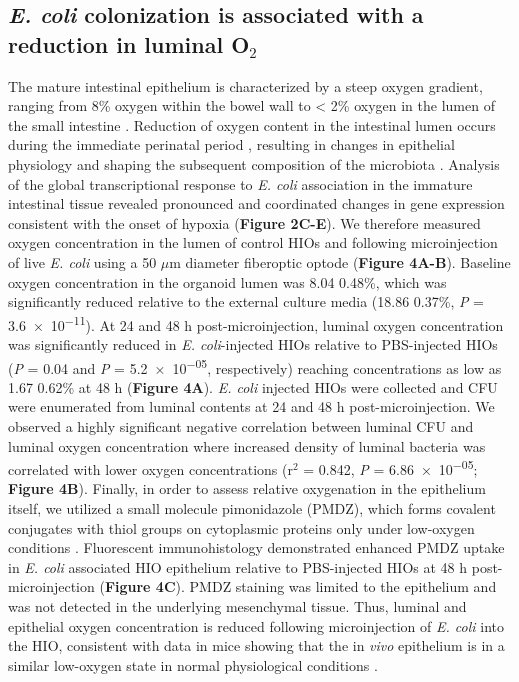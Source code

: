 \documentclass[9pt,lineo]{elife}
\begin{document}
\subsection*{{\bfseries\sffamily } \emph{E. coli} colonization is associated with a reduction in luminal O\(_{\text{2}}\)}
\label{sec:orgheadline6}
The mature intestinal epithelium is characterized by a steep oxygen gradient, ranging from 8\% oxygen within the bowel wall to < 2\% oxygen in the lumen of the small intestine \citep{Fisher:2013}. Reduction of oxygen content in the intestinal lumen occurs during the immediate perinatal period \citep{Gruette:1965}, resulting in changes in epithelial physiology \citep{Glover:2016,Kelly:2015,Colgan:2013,Zeitouni:2016} and shaping the subsequent composition of the microbiota \citep{Schmidt:2014,Espey:2013,Albenberg:2014,Palmer:2007,Koenig:2011}. Analysis of the global transcriptional response to \emph{E. coli} association in the immature intestinal tissue revealed pronounced and coordinated changes in gene expression consistent with the onset of hypoxia (\textbf{Figure 2C-E}). We therefore measured oxygen concentration in the lumen of control HIOs and following microinjection of live \emph{E. coli} using a 50 \(\mu\)m diameter fiberoptic optode (\textbf{Figure 4A-B}). Baseline oxygen concentration in the organoid lumen was 8.04 \textpm{} 0.48\%, which was significantly reduced relative to the external culture media (18.86 \textpm{} 0.37\%, \emph{P} = \num{3.6e-11}). At 24 and 48 h post-microinjection, luminal oxygen concentration was significantly reduced in \emph{E. coli}-injected HIOs relative to PBS-injected HIOs (\emph{P} = \num{0.04} and \emph{P} = \num{5.2e-05}, respectively) reaching concentrations as low as 1.67 \textpm{} 0.62\% at 48 h (\textbf{Figure 4A}). \emph{E. coli} injected HIOs were collected and CFU were enumerated from luminal contents at 24 and 48 h post-microinjection. We observed a highly significant negative correlation between luminal CFU and luminal oxygen concentration where increased density of luminal bacteria was correlated with lower oxygen concentrations (r\(^{\text{2}}\) = 0.842, \emph{P} = \num{6.86e-05}; \textbf{Figure 4B}). Finally, in order to assess relative oxygenation in the epithelium itself, we utilized a small molecule pimonidazole (PMDZ), which forms covalent conjugates with thiol groups on cytoplasmic proteins only under low-oxygen conditions \citep{Arteel:1998}. Fluorescent immunohistology demonstrated enhanced PMDZ uptake in \emph{E. coli} associated HIO epithelium relative to PBS-injected HIOs at 48 h post-microinjection (\textbf{Figure 4C}). PMDZ staining was limited to the epithelium and was not detected in the underlying mesenchymal tissue. Thus, luminal and epithelial oxygen concentration is reduced following microinjection of \emph{E. coli} into the HIO, consistent with data in mice showing that the in \emph{vivo} epithelium is in a similar low-oxygen state in normal physiological conditions \citep{Schmidt:2014,Kelly:2015,Kim:2017}.
\end{document}
